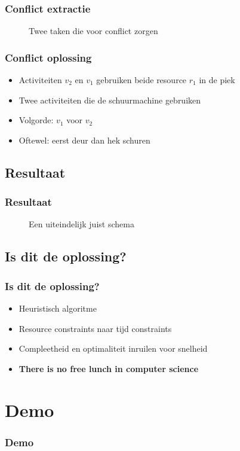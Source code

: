 \documentclass{beamer}
\theoremstyle{definition}
\newcommand{\inputtikz}[1]{}
\begin{document}
\begin{frame}
	\frametitle{Conflict extractie}
	\vspace{-1.2em}
	\begin{figure}[ht]
		\makebox[\textwidth][c]{\resizebox{.36\paperwidth}{!}{
			\inputtikz{schedule_infeasible_colored_profile_2}
		}}
		\vspace{-1.3em}
		\caption{Twee taken die voor conflict zorgen}
	\end{figure}
\end{frame}

\begin{frame}
	\frametitle{Conflict oplossing}
	\begin{itemize}
		\item Activiteiten $v_2$ en $v_1$ gebruiken beide resource $r_1$ in de piek
		\item Twee activiteiten die de schuurmachine gebruiken
		\item<2-> Volgorde: $v_1$ voor $v_2$
		\item<2-> Oftewel: eerst deur dan hek schuren
	\end{itemize}
\end{frame}

\subsection{Resultaat}
\begin{frame}
	\frametitle{Resultaat}
	\vspace{-0.2em}
	\begin{figure}[ht]
		\makebox[\textwidth][c]{\resizebox{.38\paperwidth}{!}{
			\inputtikz{schedule_feasible_profile}
		}}
		\vspace{-1.3em}
		\caption{Een uiteindelijk juist schema}
	\end{figure}
\end{frame}

\subsection{Is dit de oplossing?}
\begin{frame}
	\frametitle{Is dit de oplossing?}
	\begin{itemize}
		\item Heuristisch algoritme
		\item Resource constraints naar tijd constraints
		\item Compleetheid en optimaliteit inruilen voor snelheid
		\item<2-> \textbf{There is no free lunch in computer science}
	\end{itemize}
\end{frame}
	

\section{Demo}
\begin{frame}
	\frametitle{Demo}
\end{frame}
\end{document}

